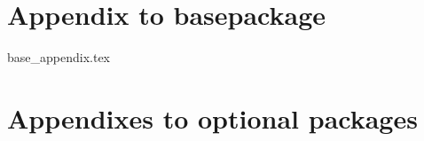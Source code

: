 \appendix

\chapter {Appendix to basepackage}
 {base_appendix.tex}

\chapter {Appendixes to optional packages}
